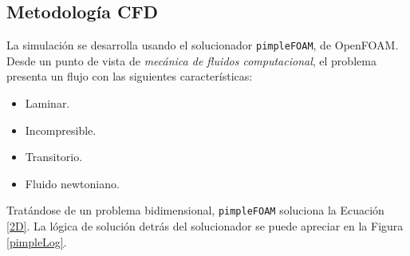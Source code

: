 \subsection{Metodolog\'ia CFD} \label{MetCFD}



\noindent
\justify

La simulaci\'on se desarrolla usando el solucionador \texttt{pimpleFOAM}, de OpenFOAM. Desde un punto de vista de \textit{mec\'anica de fluidos computacional}, el problema presenta un flujo con las siguientes caracter\'isticas:

\begin{itemize}
	\item Laminar.
	\item Incompresible.
	\item Transitorio.
	\item Fluido newtoniano.
\end{itemize}

\noindent
\justify

Trat\'andose de un problema bidimensional, \texttt{pimpleFOAM} soluciona la Ecuaci\'on \ref{2D}. La l\'ogica de soluci\'on detr\'as del solucionador se puede apreciar en la Figura \ref{pimpleLog}.
